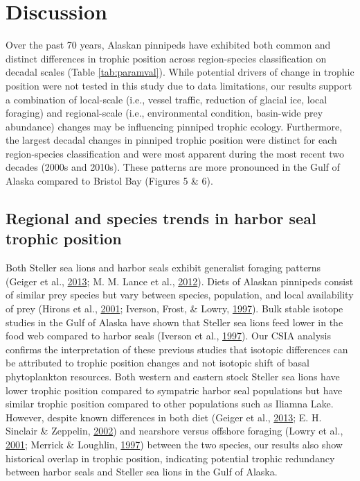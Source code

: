 \documentclass [11pt, proquest] {uwthesis}[2015/03/03]
\begin{document}
\section{Discussion}\label{discussion-3}

Over the past 70 years, Alaskan pinnipeds have exhibited both common and
distinct differences in trophic position across region-species
classification on decadal scales (Table \ref{tab:paramval}). While
potential drivers of change in trophic position were not tested in this
study due to data limitations, our results support a combination of
local-scale (i.e., vessel traffic, reduction of glacial ice, local
foraging) and regional-scale (i.e., environmental condition, basin-wide
prey abundance) changes may be influencing pinniped trophic ecology.
Furthermore, the largest decadal changes in pinniped trophic position
were distinct for each region-species classification and were most
apparent during the most recent two decades (2000s and 2010s). These
patterns are more pronounced in the Gulf of Alaska compared to Bristol
Bay (Figures 5 \& 6).

\subsection{Regional and species trends in harbor seal trophic
position}\label{regional-and-species-trends-in-harbor-seal-trophic-position}

Both Steller sea lions and harbor seals exhibit generalist foraging
patterns (Geiger et al., \protect\hyperlink{ref-Geiger2013}{2013}; M. M.
Lance et al., \protect\hyperlink{ref-Lance2012}{2012}). Diets of Alaskan
pinnipeds consist of similar prey species but vary between species,
population, and local availability of prey (Hirons et al.,
\protect\hyperlink{ref-Hirons2001}{2001}; Iverson, Frost, \& Lowry,
\protect\hyperlink{ref-Iverson1997}{1997}). Bulk stable isotope studies
in the Gulf of Alaska have shown that Steller sea lions feed lower in
the food web compared to harbor seals (Iverson et al.,
\protect\hyperlink{ref-Iverson1997}{1997}). Our CSIA analysis confirms
the interpretation of these previous studies that isotopic differences
can be attributed to trophic position changes and not isotopic shift of
basal phytoplankton resources. Both western and eastern stock Steller
sea lions have lower trophic position compared to sympatric harbor seal
populations but have similar trophic position compared to other
populations such as Iliamna Lake. However, despite known differences in
both diet (Geiger et al., \protect\hyperlink{ref-Geiger2013}{2013}; E.
H. Sinclair \& Zeppelin, \protect\hyperlink{ref-Sinclair2002}{2002}) and
nearshore versus offshore foraging (Lowry et al.,
\protect\hyperlink{ref-Lowry2001}{2001}; Merrick \& Loughlin,
\protect\hyperlink{ref-Merrick1997}{1997}) between the two species, our
results also show historical overlap in trophic position, indicating
potential trophic redundancy between harbor seals and Steller sea lions
in the Gulf of Alaska.
\end{document}
